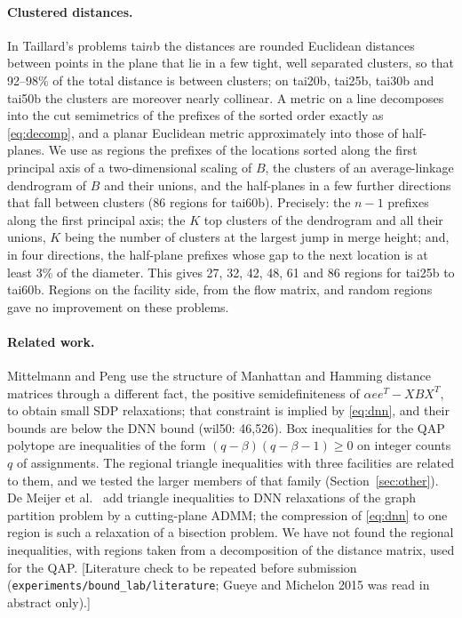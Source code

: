 \documentclass[11pt]{article}
\theoremstyle{remark}
\newcommand{\todo}[1]{{\color{red}[#1]}}
\begin{document}
\paragraph{Clustered distances.} In Taillard's problems tai$n$b \cite{taillard}
the distances are rounded Euclidean distances between points in the plane that lie
in a few tight, well separated clusters, so that 92--98\% of the total distance is
between clusters; on tai20b, tai25b, tai30b and tai50b the clusters are moreover
nearly collinear. %
A metric on a line decomposes into the cut semimetrics of the prefixes of the
sorted order exactly as \eqref{eq:decomp}, and a planar Euclidean metric
approximately into those of half-planes. We use as regions the prefixes of the
locations sorted along the first principal axis of a two-dimensional scaling of
$B$, the clusters of an average-linkage dendrogram of $B$ and their unions, and
the half-planes in a few further directions that fall between clusters (86
regions for tai60b). Precisely: the $n-1$ prefixes along the first principal axis; the $K$ top
clusters of the dendrogram and all their unions, $K$ being the number of clusters
at the largest jump in merge height; and, in four directions, the half-plane
prefixes whose gap to the next location is at least 3\% of the diameter. This
gives 27, 32, 42, 48, 61 and 86 regions for tai25b to tai60b. Regions on the
facility side, from the flow matrix, and random regions gave no improvement on
these problems.

\paragraph{Related work.} Mittelmann and Peng \cite{mp} use the structure of
Manhattan and Hamming distance matrices through a different fact, the
positive semidefiniteness of $\alpha ee^T - XBX^T$, to obtain small SDP
relaxations; that constraint is implied by \eqref{eq:dnn}, and their bounds are
below the DNN bound (wil50: 46,526). Box inequalities for the QAP polytope
\cite{jk} are inequalities of the form $(q - \beta)(q-\beta-1)\ge0$ on integer
counts $q$ of assignments. The regional triangle inequalities with three
facilities are related to them, and we tested the larger members of that family
(Section~\ref{sec:other}). De Meijer et al.\ \cite{dmswz} add triangle
inequalities to DNN relaxations of the graph partition problem by a cutting-plane
ADMM; the compression of \eqref{eq:dnn} to one region is such a relaxation of a
bisection problem. We have not found the regional inequalities, with regions
taken from a decomposition of the distance matrix, used for the QAP.
\todo{Literature check to be repeated before submission
(\texttt{experiments/bound\_lab/literature}; Gueye and Michelon 2015 was read in
abstract only).}
\end{document}
